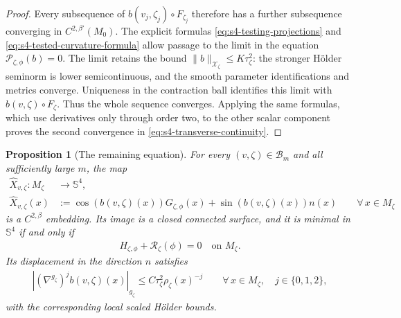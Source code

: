\documentclass[a4paper,11pt,oneside,reqno]{amsart}
\numberwithin{equation}{section}
\newtheorem{proposition}[theorem]{Proposition}
\theoremstyle{definition}
\begin{document}
\begin{proof}
    Every subsequence of $b(v_j,\zeta_j)\circ F_{\zeta_j}$
    therefore has a further subsequence converging in
    $C^{2,\beta'}(M_0)$. The explicit formulas
    \eqref{eq:s4-testing-projections} and
    \eqref{eq:s4-tested-curvature-formula} allow passage to the
    limit in the equation $\mathscr P_{\zeta,\phi}(b)=0$. The limit retains the
    bound $\|b\|_{\mathcal{X}_\zeta}\leq K\tau_\zeta^2$:
    the stronger H\"older seminorm is lower semicontinuous,
    and the smooth parameter identifications and metrics converge.
    Uniqueness in the contraction ball identifies this limit
    with $b(v,\zeta)\circ F_\zeta$. Thus the whole sequence
    converges. Applying the same formulas, which use
    derivatives only through order two, to the other scalar
    component proves the second convergence in
    \eqref{eq:s4-transverse-continuity}.
\end{proof}

\begin{proposition}[The remaining equation]
    \label{prop:s4-remaining-scalar-equation}
    For every $(v,\zeta)\in\mathcal B_m$ and all
    sufficiently large $m$, the map
    \begin{align*}
        \widehat X_{v,\zeta}:M_\zeta&\rightarrow\mathbb S^4,\\
        \widehat X_{v,\zeta}(x)
        &:=\cos(b(v,\zeta)(x))G_{\zeta,\phi}(x)
          +\sin(b(v,\zeta)(x))n(x)
          \qquad\forall\,x\in M_\zeta
    \end{align*}
    is a $C^{2,\beta}$ embedding. Its image is a closed
    connected surface, and it is minimal in $\mathbb S^4$
    if and only if
    \begin{align}
        \label{eq:s4-remaining-scalar-equation}
        H_{\zeta,\phi}+\mathcal{R}_\zeta(\phi)=0
        \quad\text{on }M_\zeta.
    \end{align}
    Its displacement in the direction $n$ satisfies
    \begin{align}
        \label{eq:s4-transverse-two-jet-final}
        |(\nabla^{g_\zeta})^j b(v,\zeta)(x)|_{g_\zeta}
        \leq C\tau_\zeta^2\rho_\zeta(x)^{-j}
        \qquad\forall\,x\in M_\zeta,\quad j\in\{0,1,2\},
    \end{align}
    with the corresponding local scaled H\"older bounds.
\end{proposition}
\end{document}
